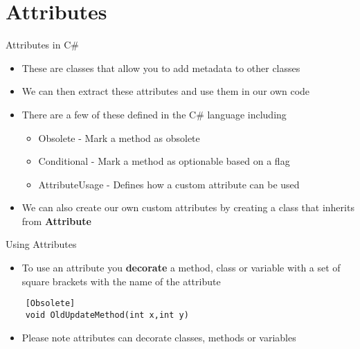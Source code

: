 \part{Attributes}
\frame{\partpage}

\begin{frame}{Attributes in C\#}
	\begin{itemize}
		\item These are classes that allow you to add metadata to other classes
		\item We can then extract these attributes and use them in our own code
		\item There are a few of these defined in the C\# language including
		\begin{itemize}
			\item Obsolete - Mark a method as obsolete
			\item Conditional - Mark a method as optionable based on a flag
			\item AttributeUsage - Defines how a custom attribute can be used
		\end{itemize}
		\item We can also create our own custom attributes by creating a class that inherits from \textbf{Attribute}
	\end{itemize}
\end{frame}

\begin{frame}[fragile]{Using Attributes}
\begin{itemize}
	\item To use an attribute you \textbf{decorate} a method, class or variable with a set of square brackets with the name of the attribute
\end{itemize}
\begin{lstlisting}
	[Obsolete]
	void OldUpdateMethod(int x,int y)
\end{lstlisting}
\begin{itemize}
	\item Please note attributes can decorate classes, methods or variables
\end{itemize}
\end{frame}

